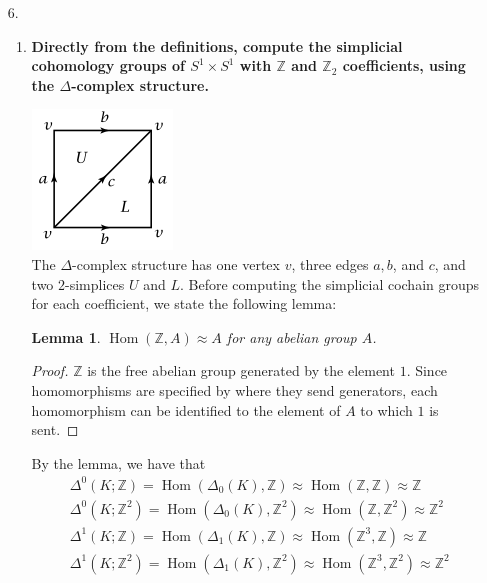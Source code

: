 \documentclass[12pt]{article}
\DeclareMathOperator{\Hom}{Hom}
\newcommand{\iso}{\approx}
\newtheorem{lemma}[theorem]{Lemma}
\begin{document}
\begin{enumerate}
    \item[6.]
        \begin{enumerate}
            \item
                \boldmath\textbf{Directly from the definitions, compute the simplicial cohomology groups of $S^1 \times S^1$ with $\mathbb{Z}$ and $\mathbb{Z}_2$ coefficients, using the $\Delta$-complex structure.
                }\unboldmath \par
                {\centering
                    \includegraphics[scale=1]{torus_delta}
                \\}
                The $\Delta$-complex structure has one vertex $v$, three edges $a, b$, and $c$, and two $2$-simplices $U$ and $L$.
                \iffalse
                    Before computing the simplicial cochain groups for each coefficient, we state the following lemma:
                    \begin{lemma}
                        $\Hom(\mathbb{Z}, A) \iso A$ for any abelian group $A$.
                    \end{lemma}
                    \begin{proof}
                        $\mathbb{Z}$ is the free abelian group generated by the element $1$. Since homomorphisms are specified by where they send generators, each homomorphism can be identified to the element of $A$ to which $1$ is sent.
                    \end{proof}
                    By the lemma, we have that
                    \begin{gather*}
                        \Delta^0(K; \mathbb{Z}) = \Hom(\Delta_0(K), \mathbb{Z}) \iso \Hom(\mathbb{Z}, \mathbb{Z}) \iso \mathbb{Z} \\
                        \Delta^0(K; \mathbb{Z}^2) = \Hom(\Delta_0(K), \mathbb{Z}^2) \iso \Hom(\mathbb{Z}, \mathbb{Z}^2) \iso \mathbb{Z}^2 \\
                        \Delta^1(K; \mathbb{Z}) = \Hom(\Delta_1(K), \mathbb{Z}) \iso \Hom(\mathbb{Z}^3, \mathbb{Z}) \iso \mathbb{Z} \\
                        \Delta^1(K; \mathbb{Z}^2) = \Hom(\Delta_1(K), \mathbb{Z}^2) \iso \Hom(\mathbb{Z}^3, \mathbb{Z}^2) \iso \mathbb{Z}^2 \\

\end{gather*}
\end{enumerate}
\end{enumerate}
\end{document}
